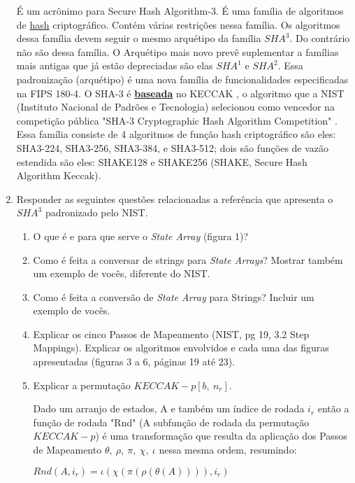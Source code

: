 \documentclass[conference]{IEEEtran}
\begin{document}
\begin{enumerate}
É um acrônimo para Secure Hash Algorithm-3. É uma família de algoritmos de
\underline{hash} criptográfico. Contém várias restrições nessa família. Os
algoritmos dessa família devem seguir o mesmo arquétipo da família $SHA^3$. Do
contrário não são dessa família. O Arquétipo mais novo prevê suplementar a
famílias mais antigas que já estão depreciadas são elas $SHA^1$ e $SHA^2$. Essa
padronização (arquétipo) é uma nova família de funcionalidades especificadas na
FIPS 180-4\cite{fips}. O SHA-3 é \underline{\textbf{baseada}} no \textsc{KECCAK}
\cite{keccak}, o algoritmo que a NIST (Instituto Nacional de Padrões e
Tecnologia) selecionou como vencedor na competição pública "SHA-3 Cryptographic
Hash Algorithm Competition" \cite{sha3}. Essa família consiste de 4 algoritmos
de função hash criptográfico são eles: SHA3-224, SHA3-256, SHA3-384, e SHA3-512;
dois são funções de vazão estendida são eles: SHAKE128 e SHAKE256 (SHAKE, Secure
Hash Algorithm Keccak).

\item Responder as seguintes questões relacionadas a referência\cite{nist} que
apresenta o $SHA^3$ padronizado pelo NIST.

\begin{enumerate}

\item O que é e para que serve o \textit{State Array} (figura 1)?

\item Como é feita a conversar de strings para \textit{State Arrays}? Mostrar
também um exemplo de vocês, diferente do NIST.

\item Como é feita a conversão de \textit{State Array} para Strings? Incluir um
exemplo de vocês.

\item Explicar os cinco Passos de Mapeamento (NIST, pg 19, 3.2 Step Mappings).
Explicar os algoritmos envolvidos e cada uma das figuras apresentadas (figuras 3
a 6, páginas 19 até 23).

\item Explicar a permutação $KECCAK-p[b,\ n_r]$.

Dado um arranjo de estados, A e também um índice de rodada $i_r$ então a função
de rodada "Rnd" (A subfunção de rodada da permutação $KECCAK -p$) é uma
transformação que resulta da aplicação dos Passos de Mapeamento $\theta,\ \rho,\
\pi,\ \chi,\ \iota$ nessa mesma ordem, resumindo:

$Rnd(A, i_r) = \iota(\chi(\pi(\rho(\theta(A)))), i_r)$


\end{enumerate}
\end{enumerate}
\end{document}
